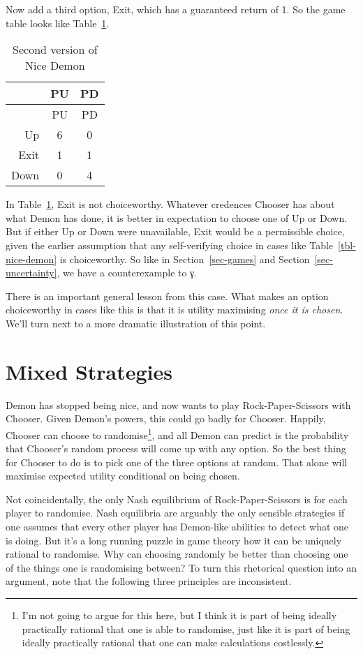 \documentclass[
  11pt,
  letterpaper,
  DIV=11,
  numbers=noendperiod,
  twoside]{scrartcl}
\begin{document}
Now add a third option, Exit, which has a guaranteed return of 1. So the
game table looks like Table~\ref{tbl-nice-demon-exit}.

\begin{longtable}[]{@{}rcc@{}}
\caption{Second version of Nice
Demon}\label{tbl-nice-demon-exit}\tabularnewline
\toprule\noalign{}
& PU & PD \\
\midrule\noalign{}
\endfirsthead
\toprule\noalign{}
& PU & PD \\
\midrule\noalign{}
\endhead
\bottomrule\noalign{}
\endlastfoot
Up & 6 & 0 \\
Exit & 1 & 1 \\
Down & 0 & 4 \\
\end{longtable}

In Table~\ref{tbl-nice-demon-exit}, Exit is not choiceworthy. Whatever
credences Chooser has about what Demon has done, it is better in
expectation to choose one of Up or Down. But if either Up or Down were
unavailable, Exit would be a permissible choice, given the earlier
assumption that any self-verifying choice in cases like
Table~\ref{tbl-nice-demon} is choiceworthy. So like in
Section~\ref{sec-games} and Section~\ref{sec-uncertainty}, we have a
counterexample to γ.

There is an important general lesson from this case. What makes an
option choiceworthy in cases like this is that it is utility maximising
\emph{once it is chosen}. We'll turn next to a more dramatic
illustration of this point.

\section{Mixed Strategies}\label{sec-mixed}

Demon has stopped being nice, and now wants to play Rock-Paper-Scissors
with Chooser. Given Demon's powers, this could go badly for Chooser.
Happily, Chooser can choose to randomise\footnote{I'm not going to argue
  for this here, but I think it is part of being ideally practically
  rational that one is able to randomise, just like it is part of being
  ideally practically rational that one can make calculations
  costlessly.}, and all Demon can predict is the probability that
Chooser's random process will come up with any option. So the best thing
for Chooser to do is to pick one of the three options at random. That
alone will maximise expected utility conditional on being chosen.

Not coincidentally, the only Nash equilibrium of Rock-Paper-Scissors is
for each player to randomise. Nash equilibria are arguably the only
sensible strategies if one assumes that every other player has
Demon-like abilities to detect what one is doing. But it's a long
running puzzle in game theory how it can be uniquely rational to
randomise. Why can choosing randomly be better than choosing one of the
things one is randomising between? To turn this rhetorical question into
an argument, note that the following three principles are inconsistent.
\end{document}
